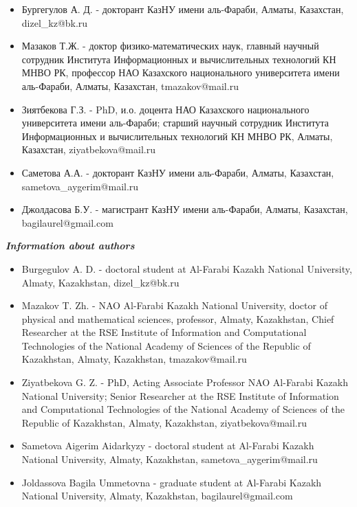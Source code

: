 \begin{itemize}
\item
Бургегулов А. Д. - докторант КазНУ имени аль-Фараби, Алматы, Казахстан,
dizel\_kz@bk.ru

\item
Мазаков Т.Ж. - доктор физико-математических наук, главный научный
сотрудник Института Информационных и вычислительных технологий КН МНВО
РК, профессор НАО Казахского национального университета имени
аль-Фараби, Алматы, Казахстан, tmazakov@mail.ru

\item
Зиятбекова Г.З. - PhD, и.о. доцента НАО Казахского национального
университета имени аль-Фараби; старший научный сотрудник Института
Информационных и вычислительных технологий КН МНВО РК, Алматы,
Казахстан, ziyatbekova@mail.ru

\item
Саметова А.А. - докторант КазНУ имени аль-Фараби, Алматы, Казахстан,
sametova\_aygerim@mail.ru

\item
Джолдасова Б.У. - магистрант КазНУ имени аль-Фараби, Алматы, Казахстан,
bagilaurel@gmail.com
\end{itemize}

\emph{{\bfseries Information about authors}}

\begin{itemize}
\item
Burgegulov A. D. - doctoral student at Al-Farabi Kazakh National
University, Almaty, Kazakhstan, dizel\_kz@bk.ru

\item
Mazakov T. Zh. - NAO Al-Farabi Kazakh National University, doctor of
physical and mathematical sciences, professor, Almaty, Kazakhstan, Chief
Researcher at the RSE Institute of Information and Computational
Technologies of the National Academy of Sciences of the Republic of
Kazakhstan, Almaty, Kazakhstan,
tmazakov@mail.ru

\item
Ziyatbekova G. Z. - PhD, Acting Associate Professor NAO Al-Farabi
Kazakh National University; Senior Researcher at the RSE Institute of
Information and Computational Technologies of the National Academy of
Sciences of the Republic of Kazakhstan, Almaty, Kazakhstan,
ziyatbekova@mail.ru

\item
Sametova Aigerim Aidarkyzy - doctoral student at Al-Farabi Kazakh
National University, Almaty, Kazakhstan,
sametova\_aygerim@mail.ru

\item
Joldassova Bagila Ummetovna - graduate student at Al-Farabi Kazakh
National University, Almaty, Kazakhstan, bagilaurel@gmail.com
\end{itemize}
